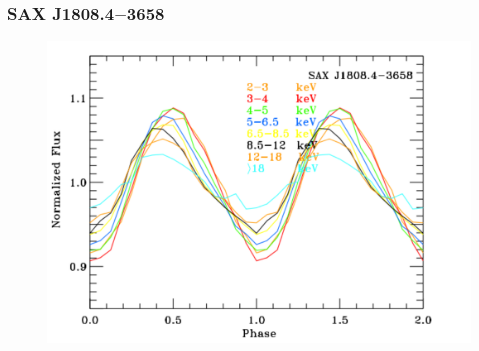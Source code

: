 \documentclass{beamer}
\begin{document}
\begin{frame}
\frametitle{SAX J1808.4$-$3658}

\begin{figure}
\includegraphics[width=0.8\linewidth]{data_sax1808.pdf}
\end{figure}

\end{frame}


\end{document}
